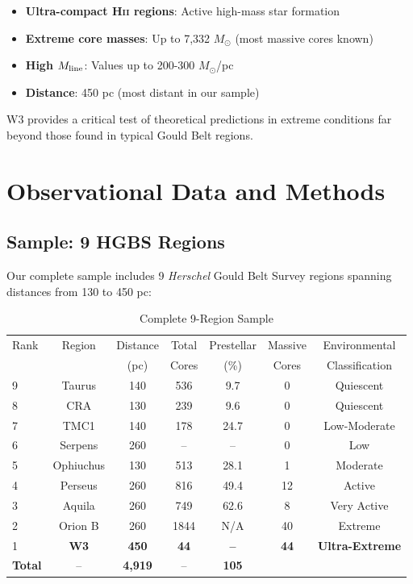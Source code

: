 \documentclass[11pt,a4paper]{article}
\begin{document}
\begin{itemize}
    \item \textbf{Ultra-compact H\textsc{ii} regions}: Active high-mass star formation
    \item \textbf{Extreme core masses}: Up to 7,332 $M_\odot$ (most massive cores known)
    \item \textbf{High $M_{\rm line}$}: Values up to 200-300 $M_\odot$/pc
    \item \textbf{Distance}: 450 pc (most distant in our sample)
\end{itemize}

W3 provides a critical test of theoretical predictions in extreme conditions far beyond those found in typical Gould Belt regions.

\section{Observational Data and Methods}

\subsection{Sample: 9 HGBS Regions}

Our complete sample includes 9 \textit{Herschel} Gould Belt Survey regions spanning distances from 130 to 450 pc:

\begin{table}[H]
\centering
\caption{Complete 9-Region Sample}
\begin{tabular}{lcccccc}
\toprule
Rank & Region & Distance & Total & Prestellar & Massive & Environmental \\
     &        & (pc)   & Cores & (\%)    & Cores & Classification \\
\midrule
9 & Taurus   & 140     & 536   & 9.7   & 0      & Quiescent \\
8 & CRA      & 130     & 239   & 9.6   & 0      & Quiescent \\
7 & TMC1     & 140     & 178   & 24.7  & 0      & Low-Moderate \\
6 & Serpens  & 260     & --    & --    & 0      & Low \\
5 & Ophiuchus& 130     & 513   & 28.1  & 1      & Moderate \\
4 & Perseus  & 260     & 816   & 49.4  & 12     & Active \\
3 & Aquila   & 260     & 749   & 62.6  & 8      & Very Active \\
2 & Orion B  & 260     & 1844  & N/A   & 40     & Extreme \\
1 & \textbf{W3}    & \textbf{450}     & \textbf{44}   & \textbf{--}    & \textbf{44}      & \textbf{Ultra-Extreme} \\
\midrule
\textbf{Total} & --      & \textbf{4,919} & --    & \textbf{105} & \\
\bottomrule
\end{tabular}
\end{table}
\end{document}
